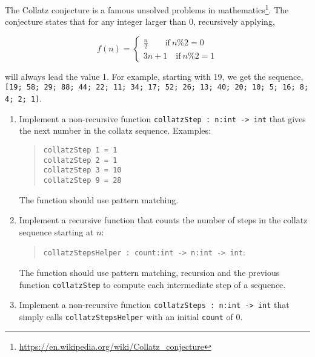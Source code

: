 The Collatz conjecture is a famous unsolved problems in mathematics\footnote{\url{https://en.wikipedia.org/wiki/Collatz_conjecture}}. The conjecture states that for any integer larger than 0, recursively applying,

\[
  f(n) = 
  \begin{cases}
    \frac{n}{2} \qquad \mathrm{if} ~ n \% 2 = 0 \\
    3n+1 \quad \mathrm{if} ~ n \% 2 = 1
  \end{cases}
\]

will always lead the value 1. For example, starting with 19, we get the sequence, \lstinline{[19; 58; 29; 88; 44; 22; 11; 34; 17; 52; 26; 13; 40; 20; 10; 5; 16; 8; 4; 2; 1]}.

\begin{enumerate}
  \item Implement a non-recursive function \lstinline{collatzStep : n:int -> int} that gives the next number in the collatz sequence. Examples:
  \begin{quote}
    \lstinline{collatzStep 1 = 1} \\
    \lstinline{collatzStep 2 = 1} \\
    \lstinline{collatzStep 3 = 10} \\
    \lstinline{collatzStep 9 = 28} \\    
  \end{quote}
  The function should use pattern matching. 
  \item Implement a recursive function that counts the number of steps in the collatz sequence starting at $n$:
  \begin{quote}
  \lstinline{collatzStepsHelper : count:int -> n:int -> int}:
\end{quote}
The function should use pattern matching, recursion and the previous function \lstinline{collatzStep} to compute each intermediate step of a sequence. 
  \item Implement a non-recursive function \lstinline{collatzSteps : n:int -> int} that simply calls \lstinline{collatzStepsHelper} with an initial \lstinline{count} of 0. 
\end{enumerate}
